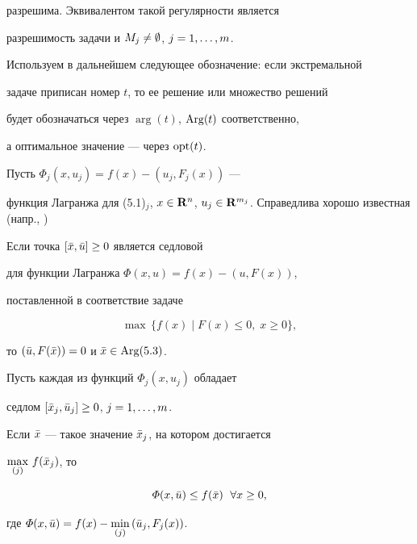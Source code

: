 разрешима. Эквивалентом такой регулярности является


разрешимость задачи и $M_j \ne \emptyset$, $j=1,\dotsc,m$.





Используем в дальнейшем следующее обозначение: если экстремальной


задаче приписан номер $t$, то ее решение или множество решений


будет обозначаться через $\arg (t)$, $\operatorname{Arg}(t)$ соответственно,


а оптимальное значение --- через $\operatorname{opt}(t)$.





Пусть $\varPhi_j (x, u_j) = f(x) - (u_j, F_j (x))$ ---


функция Лагранжа для (5.1)$_j$, $x \in \R^n$, $u_j


\in \R^{m_j}$. Справедлива хорошо известная (напр., \cite{AHU})





\begin{lems}


Если точка $[ \Bar{x}, \Bar{u} ] \ge 0$ является седловой


для функции Лагранжа $\varPhi (x, u) = f(x) - (u, F(x))$,


поставленной в соответствие задаче


\begin{equation}


\max\, \{ f(x) \mid F(x) \le 0,\; x \ge 0 \},


\end{equation}


то $(\Bar{u}, F(\Bar{x})) =0$ и $\bar{x} \in \operatorname{Arg} (5.3)$.


\end{lems}





\begin{lems}


Пусть каждая из функций $\varPhi_j (x, u_j)$ обладает


седлом $[ \Bar{x}_j, \Bar{u}_j ] \ge 0$, $j=1,\dotsc,m$.


Если $\Bar{x}$ --- такое значение $\Bar{x}_j$, на котором достигается


$\max\limits_{(j)}\, f(\Bar{x}_j)$, то


\begin{equation}


\varPhi (x, \Bar{u})\le f(\Bar{x}) \ \; \forall x \ge 0,


\end{equation}


где $\varPhi (x, \Bar{u}) = f(x) - \min\limits_{(j)}\,


(\Bar{u}_j, F_j (x))$.


\end{lems}





